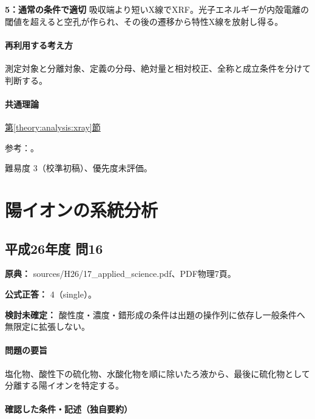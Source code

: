 \noindent\textbf{5：通常の条件で適切} 吸収端より短いX線でXRF。光子エネルギーが内殻電離の閾値を超えると空孔が作られ、その後の遷移から特性X線を放射し得る。\par

\paragraph{再利用する考え方} 測定対象と分離対象、定義の分母、絶対量と相対校正、全称と成立条件を分けて判断する。

\paragraph{共通理論} \hyperref[theory:analysis:xray]{第\ref*{theory:analysis:xray}節}

\par 参考：\cite{analysis49_xps_ref,analysis49_esr_ref,atomic_ir_raman}。

\par 難易度 3（校準初稿）、優先度未評価。

\section{陽イオンの系統分析}

\subsection{平成26年度 問16}
\label{q:h26-reg-applied-16}

\noindent\textbf{原典：} sources/H26/17\_applied\_science.pdf、PDF物理7頁。

\textbf{公式正答：} 4（single）。

\par\textbf{検討未確定：} 酸性度・濃度・錯形成の条件は出題の操作列に依存し一般条件へ無限定に拡張しない。

\paragraph{問題の要旨} 塩化物、酸性下の硫化物、水酸化物を順に除いたろ液から、最後に硫化物として分離する陽イオンを特定する。

\paragraph{確認した条件・記述（独自要約）}\mbox{}\par

